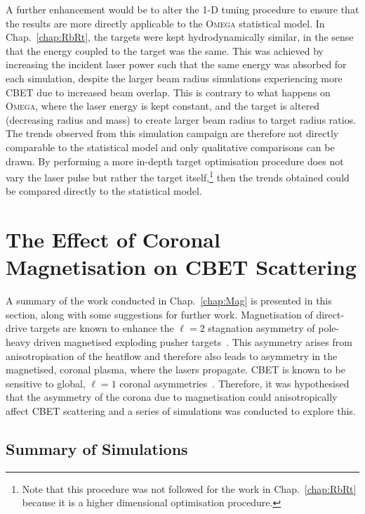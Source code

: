 A further enhancement would be to alter the 1-D tuning procedure to ensure that the results are more directly applicable to the \textsc{Omega} statistical model.
In Chap.~\ref{chap:RbRt}, the targets were kept hydrodynamically similar, in the sense that the energy coupled to the target was the same.
This was achieved by increasing the incident laser power such that the same energy was absorbed for each simulation, despite the larger beam radius simulations experiencing more \ac{CBET} due to increased beam overlap.
This is contrary to what happens on \textsc{Omega}, where the laser energy is kept constant, and the target is altered (decreasing radius and mass) to create larger beam radius to target radius ratios.
The trends observed from this simulation campaign are therefore not directly comparable to the statistical model and only qualitative comparisons can be drawn.
By performing a more in-depth target optimisation procedure does not vary the laser pulse but rather the target itself,\footnote{Note that this procedure was not followed for the work in Chap.~\ref{chap:RbRt} because it is a higher dimensional optimisation procedure.} then the trends obtained could be compared directly to the statistical model.

\section{The Effect of Coronal Magnetisation on CBET Scattering}

A summary of the work conducted in Chap.~\ref{chap:Mag} is presented in this section, along with some suggestions for further work.
Magnetisation of direct-drive targets are known to enhance the $\ell=2$ stagnation asymmetry of pole-heavy driven magnetised exploding pusher targets~\cite{bose_effect_2022}.
This asymmetry arises from anisotropisation of the heatflow and therefore also leads to asymmetry in the magnetised, coronal plasma, where the lasers propagate.
\ac{CBET} is known to be sensitive to global, $\ell=1$ coronal asymmetries~\cite{colaitis_inverse_2021}.
Therefore, it was hypothesised that the asymmetry of the corona due to magnetisation could anisotropically affect \ac{CBET} scattering and a series of simulations was conducted to explore this.

\subsection{Summary of Simulations}


